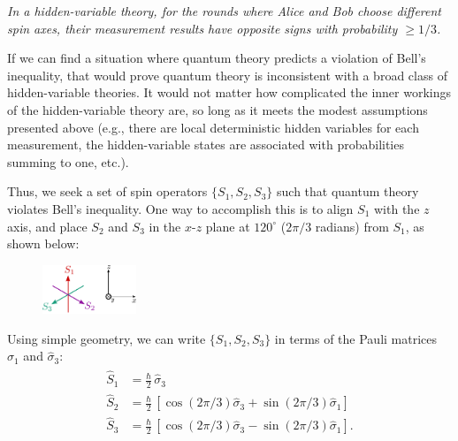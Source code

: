 \documentclass[prx,12pt]{revtex4-2}
\begin{document}
\begin{framed}
\noindent
\textit{In a hidden-variable theory, for the rounds where Alice and
  Bob choose different spin axes, their measurement results have
  opposite signs with probability $\ge 1/3$.}
\end{framed}

If we can find a situation where quantum theory predicts a violation
of Bell's inequality, that would prove quantum theory is inconsistent
with a broad class of hidden-variable theories.  It would not matter
how complicated the inner workings of the hidden-variable theory are,
so long as it meets the modest assumptions presented above (e.g.,
there are local deterministic hidden variables for each measurement,
the hidden-variable states are associated with probabilities summing
to one, etc.).

Thus, we seek a set of spin operators $\{S_1, S_2, S_3\}$ such that
quantum theory violates Bell's inequality.  One way to accomplish this
is to align $S_1$ with the $z$ axis, and place $S_2$ and $S_3$ in the
$x$-$z$ plane at $120^\circ$ ($2\pi/3$ radians) from $S_1$, as shown
below:

\begin{figure}[h]
  \centering\includegraphics[width=0.25\textwidth]{bellaxes}
\end{figure}

\noindent
Using simple geometry, we can write $\{S_1, S_2, S_3\}$ in terms of
the Pauli matrices $\hat{\sigma}_1$ and $\hat{\sigma}_3$:
\begin{align}
  \begin{aligned}\hat{S}_1 &= \frac{\hbar}{2} \, \hat{\sigma}_3
    \\ \hat{S}_2 &= \frac{\hbar}{2} \, \left[\cos(2\pi/3) \hat{\sigma}_3 + \sin(2\pi/3)\hat{\sigma}_1\right]  \\   \hat{S}_3 &= \frac{\hbar}{2} \, \left[\cos(2\pi/3) \hat{\sigma}_3 - \sin(2\pi/3)\hat{\sigma}_1\right].\end{aligned}
\end{align}
\end{document}
